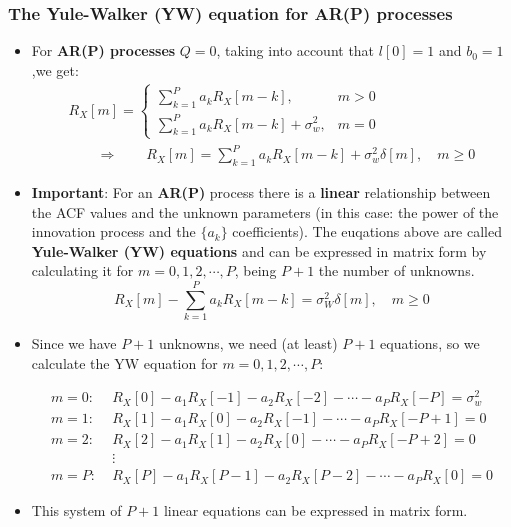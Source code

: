 \subsubsection{The Yule-Walker (YW) equation for AR(P) processes}
\begin{itemize}
    \item For \textbf{AR(P) processes} \(Q=0\), taking into account that \(l[0]=1\) and \(b_0=1\),we get:
\begin{align*}
R_X[m] =
\begin{cases}
\displaystyle\sum_{k=1}^{P} a_k R_X[m-k], & m>0 \\[8pt]
\displaystyle\sum_{k=1}^{P} a_k R_X[m-k] + \sigma_w^2, & m=0
\end{cases}\\[4pt]
\qquad\Longrightarrow\qquad
R_X[m] = \sum_{k=1}^{P} a_k R_X[m-k] + \sigma_w^2 \delta[m], \quad m\ge 0
\end{align*}
\item \textbf{Important}: For an \textbf{AR(P)} process there is a \textbf{linear} relationship between the ACF values and the unknown parameters (in this case: the power of the innovation process and the \(\{a_k\}\) coefficients). The euqations above are called \textbf{Yule-Walker (YW) equations} and can be expressed in matrix form by calculating it for \(m=0,1,2,\cdots,P\), being \(P+1\) the number of unknowns.
\[
R_X[m]-\sum_{k=1}^{P}a_kR_X[m-k]=\sigma_W^2\delta[m],\quad m\geq 0
\]
\item Since we have \(P+1\) unknowns, we need (at least) \(P+1\) equations, so we calculate the YW equation for \(m=0,1,2,\cdots,P\):

\begin{align*}
m=0:\;& R_X[0] - a_1 R_X[-1] - a_2 R_X[-2] - \cdots - a_P R_X[-P] = \sigma_w^2 \\[4pt]
m=1:\;& R_X[1] - a_1 R_X[0]  - a_2 R_X[-1] - \cdots - a_P R_X[-P+1] = 0 \\[4pt]
m=2:\;& R_X[2] - a_1 R_X[1]  - a_2 R_X[0]  - \cdots - a_P R_X[-P+2] = 0 \\[4pt]
&\vdots \\[4pt]
m=P:\;& R_X[P] - a_1 R_X[P-1] - a_2 R_X[P-2] - \cdots - a_P R_X[0] = 0
\end{align*}

\item This system of \(P+1\) linear equations can be expressed in matrix form.


\end{itemize}
